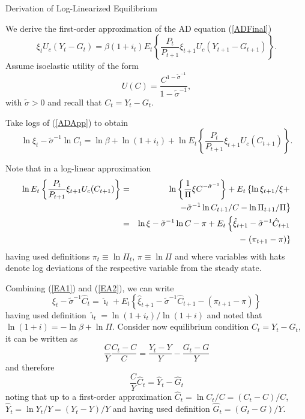 \documentclass[11pt,aspectratio=169]{beamer}
\begin{document}
\begin{frame}[label=Appendix F]{Derivation of Log-Linearized Equilibrium} 

We derive the first-order approximation of the AD equation (\ref{ADFinal}) 
\begin{equation}
\xi _{t}U_{c}(Y_{t}-G_{t})=\beta (1+i_{t})E_{t}\left\{ \frac{P_{t}}{P_{t+1}}%
\xi _{t+1}U_{c}(Y_{t+1}-G_{t+1})\right\} .  \label{ADApp}
\end{equation}%
Assume isoelastic utility of the form%
\begin{equation*}
U(C)=\frac{C^{1-\tilde{\sigma}^{-1}}}{1-\tilde{\sigma}^{-1}},
\end{equation*}%
with $\tilde{\sigma}>0$ and recall that $C_{t}=Y_{t}-G_{t}$.

Take logs of (\ref{ADApp}) to obtain%
\begin{equation}
\ln \xi _{t}-\tilde{\sigma}^{-1}\ln C_{t}=\ln \beta +\ln (1+i_{t})+\ln
E_{t}\left\{ \frac{P_{t}}{P_{t+1}}\xi _{t+1}U_{c}(C_{t+1})\right\} .
\label{EA1}
\end{equation}%
\end{frame}
\begin{frame}
Note that in a log-linear approximation%
\begin{eqnarray}
\ln E_{t}\left\{ \frac{P_{t}}{P_{t+1}}\xi _{t+1}U_{c}(C_{t+1})\right\}
&=&\ln \left\{ \frac{1}{\Pi }\xi C^{-\tilde{\sigma}^{-1}}\right\}
+E_{t}\left\{ \ln \xi _{t+1}/\xi +\right.  \notag \\
&&\left. -\tilde{\sigma}^{-1}\ln C_{t+1}/C-\ln \Pi _{t+1}/\Pi \right\} 
\notag \\
&=&\ln \xi -\tilde{\sigma}^{-1}\ln C-\pi +E_{t}\left\{ \hat{\xi}_{t+1}-%
\tilde{\sigma}^{-1}\hat{C}_{t+1}\right.  \notag \\
&&-\left. (\pi _{t+1}-\pi )\right\}  \label{EA2}
\end{eqnarray}%
having used definitions $\pi _{t}\equiv \ln \Pi _{t}$, $\pi \equiv \ln \Pi $
and where variables with hats denote log deviations of the respective
variable from the steady state. 
\end{frame}
\begin{frame}
Combining (\ref{EA1}) and (\ref{EA2}), we
can write%
\begin{equation}
\hat{\xi}_{t}-\tilde{\sigma}^{-1}\hat{C}_{t}=\hat{\imath}_{t}+E_{t}\left\{ 
\hat{\xi}_{t+1}-\tilde{\sigma}^{-1}\hat{C}_{t+1}-(\pi _{t+1}-\pi )\right\}
\label{EA3}
\end{equation}%
having used definition $\hat{\imath}_{t}=\ln (1+i_{t})/\ln (1+i)$ and noted
that $\ln (1+i)=-\ln \beta +\ln \Pi .$ Consider now equilibrium condition $%
C_{t}=Y_{t}-G_{t}$, it can be written as%
\begin{equation*}
\frac{C}{Y}\frac{C_{t}-C}{C}=\frac{Y_{t}-Y}{Y}-\frac{G_{t}-G}{Y}
\end{equation*}%
and therefore%
\begin{equation}
\frac{C}{Y}\hat{C}_{t}=\hat{Y}_{t}-\hat{G}_{t}  \label{EA4}
\end{equation}%
noting that up to a first-order approximation $\hat{C}_{t}=\ln
C_{t}/C=(C_{t}-C)/C$, $\hat{Y}_{t}=\ln Y_{t}/Y=(Y_{t}-Y)/Y$ and having used
definition $\hat{G}_{t}=(G_{t}-G)/Y.$ 
\end{frame}
\end{document}
